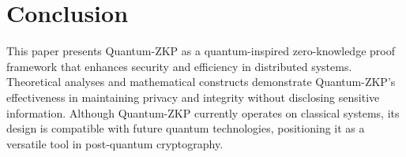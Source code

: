 \documentclass{article.cls}
\begin{document}
\section{Conclusion}
This paper presents Quantum-ZKP as a quantum-inspired zero-knowledge proof framework that enhances security and efficiency in distributed systems. Theoretical analyses and mathematical constructs demonstrate Quantum-ZKP's effectiveness in maintaining privacy and integrity without disclosing sensitive information. Although Quantum-ZKP currently operates on classical systems, its design is compatible with future quantum technologies, positioning it as a versatile tool in post-quantum cryptography.
\end{document}
